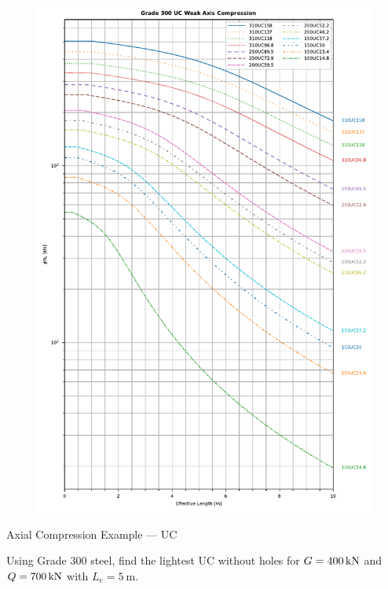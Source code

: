 \begin{figure}[p]
\centering
\includegraphics[width=.99\textwidth]{REF/UC.WEAK.NC}
\end{figure}
\begin{exmp}
Axial Compression Example --- UC

Using Grade 300 steel, find the lightest UC without holes for $G=\SI{400}{\kilo\newton}$ and $Q=\SI{700}{\kilo\newton}$ with $L_e=\SI{5}{\meter}$.
\end{exmp}
